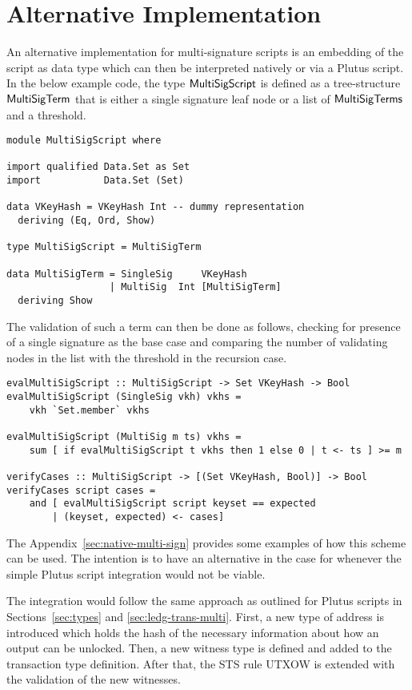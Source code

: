 \documentclass[11pt,a4paper,dvipsnames]{article}
\theoremstyle{definition}
\begin{document}
\section{Alternative Implementation}
\label{sec:altern-impl}

An alternative implementation for multi-signature scripts is an embedding of the
script as data type which can then be interpreted natively or via a Plutus
script. In the below example code, the type $\mathsf{MultiSigScript}$ is defined
as a tree-structure $\mathsf{MultiSigTerm}$ that is either a single signature leaf
node or a list of $\mathsf{MultiSigTerms}$ and a threshold.

\begin{verbatim}
module MultiSigScript where

import qualified Data.Set as Set
import           Data.Set (Set)

data VKeyHash = VKeyHash Int -- dummy representation
  deriving (Eq, Ord, Show)

type MultiSigScript = MultiSigTerm

data MultiSigTerm = SingleSig     VKeyHash
                  | MultiSig  Int [MultiSigTerm]
  deriving Show
\end{verbatim}

The validation of such a term can then be done as follows, checking for presence
of a single signature as the base case and comparing the number of validating
nodes in the list with the threshold in the recursion case.

\begin{verbatim}
evalMultiSigScript :: MultiSigScript -> Set VKeyHash -> Bool
evalMultiSigScript (SingleSig vkh) vkhs =
    vkh `Set.member` vkhs

evalMultiSigScript (MultiSig m ts) vkhs =
    sum [ if evalMultiSigScript t vkhs then 1 else 0 | t <- ts ] >= m

verifyCases :: MultiSigScript -> [(Set VKeyHash, Bool)] -> Bool
verifyCases script cases =
    and [ evalMultiSigScript script keyset == expected
        | (keyset, expected) <- cases]
\end{verbatim}

The Appendix~\ref{sec:native-multi-sign} provides some examples of how this
scheme can be used. The intention is to have an alternative in the case for
whenever the simple Plutus script integration would not be viable.

The integration would follow the same approach as outlined for Plutus scripts in
Sections~\ref{sec:types} and \ref{sec:ledg-trans-multi}. First, a new type of
address is introduced which holds the hash of the necessary information about
how an output can be unlocked. Then, a new witness type is defined and added to
the transaction type definition. After that, the STS rule UTXOW is extended with
the validation of the new witnesses.
\end{document}
